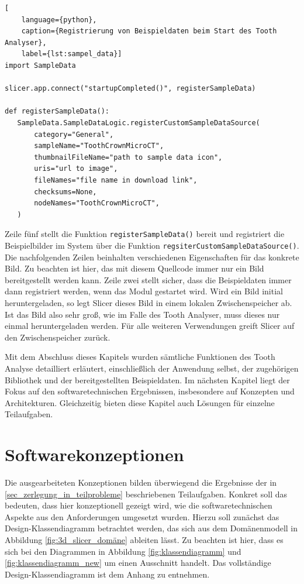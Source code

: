 \begin{lstlisting}[
    language={python},
    caption={Registrierung von Beispieldaten beim Start des Tooth Analyser},
    label={lst:sampel_data}]
import SampleData

slicer.app.connect("startupCompleted()", registerSampleData)

def registerSampleData():
   SampleData.SampleDataLogic.registerCustomSampleDataSource(
	   category="General",
	   sampleName="ToothCrownMicroCT",
	   thumbnailFileName="path to sample data icon",
	   uris="url to image",
	   fileNames="file name in download link",
	   checksums=None,
	   nodeNames="ToothCrownMicroCT",
   )
\end{lstlisting}

Zeile fünf stellt die Funktion \texttt{registerSampleData()} bereit und
registriert die Beispielbilder im System über die Funktion \texttt{regsiterCustomSampleDataSource()}.
Die nachfolgenden Zeilen beinhalten verschiedenen Eigenschaften für das konkrete
Bild. Zu beachten ist hier, das mit diesem Quellcode immer nur ein Bild
bereitgestellt werden kann. Zeile zwei stellt sicher, dass die Beispieldaten
immer dann registriert werden, wenn das Modul gestartet wird. Wird ein Bild
initial heruntergeladen, so legt Slicer dieses Bild in einem lokalen Zwischenspeicher
ab. Ist das Bild also sehr groß, wie im Falle des Tooth Analyser, muss dieses
nur einmal heruntergeladen werden. Für alle weiteren Verwendungen greift Slicer auf
den Zwischenspeicher zurück.

Mit dem Abschluss dieses Kapitels wurden sämtliche Funktionen des Tooth Analyse detailliert
erläutert, einschließlich der Anwendung selbst, der zugehörigen Bibliothek und der
bereitgestellten Beispieldaten. Im nächsten Kapitel liegt der Fokus auf den
softwaretechnischen Ergebnissen, insbesondere auf Konzepten und Architekturen.
Gleichzeitig bieten diese Kapitel auch Lösungen für einzelne Teilaufgaben.

\pagebreak

\section{Softwarekonzeptionen}
\label{sec:konzeptionen} Die ausgearbeiteten Konzeptionen bilden überwiegend die
Ergebnisse der in \ref{sec_zerlegung_in_teilprobleme} beschriebenen Teilaufgaben.
Konkret soll das bedeuten, dass hier konzeptionell gezeigt wird, wie die
softwaretechnischen Aspekte aus den Anforderungen umgesetzt wurden. Hierzu soll zunächst
das Design-Klassendiagramm betrachtet werden, das sich aus dem Domänenmodell in
Abbildung \ref{fig:3d_slicer_domäne} ableiten lässt. Zu beachten ist hier, dass
es sich bei den Diagrammen in Abbildung \ref{fig:klassendiagramm} und
\ref{fig:klassendiagramm_new} um einen Ausschnitt handelt. Das vollständige Design-Klassendiagramm
ist dem Anhang zu entnehmen.

